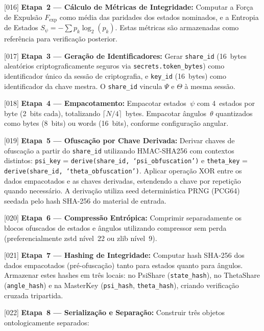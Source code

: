 \documentclass[12pt,a4paper]{article}
\newcommand{\Fexp}{F_{\text{exp}}}
\begin{document}
{[016]} \textbf{Etapa~2 --- Cálculo de Métricas de Integridade:}
Computar a Força de Expulsão $\Fexp$ como média das paridades
dos estados nominados, e a Entropia de Estados
$S_\psi = -\sum p_k \log_2(p_k)$. Estas métricas são
armazenadas como referência para verificação posterior.

{[017]} \textbf{Etapa~3 --- Geração de Identificadores:} Gerar
\texttt{share\_id} (16~bytes aleatórios criptograficamente
seguros via \texttt{secrets.token\_bytes}) como identificador
único da sessão de criptografia, e \texttt{key\_id} (16~bytes)
como identificador da chave mestra. O \texttt{share\_id}
vincula $\Psi$ e $\Theta$ à mesma sessão.

{[018]} \textbf{Etapa~4 --- Empacotamento:} Empacotar
estados~$\psi$ com 4~estados por byte (2~bits cada),
totalizando $\lceil N/4 \rceil$~bytes. Empacotar ângulos~$\theta$
quantizados como bytes (8~bits) ou words (16~bits), conforme
configuração angular.

{[019]} \textbf{Etapa~5 --- Ofuscação por Chave Derivada:}
Derivar chaves de ofuscação a partir do \texttt{share\_id}
utilizando HMAC-SHA256 com contextos distintos:
\texttt{psi\_key} = \texttt{derive(share\_id,
`psi\_obfuscation')} e \texttt{theta\_key} =
\texttt{derive(share\_id, `theta\_obfuscation')}. Aplicar
operação XOR entre os dados empacotados e as chaves derivadas,
estendendo a chave por repetição quando necessário. A derivação
utiliza seed determinística PRNG (PCG64) seedada pelo hash
SHA-256 do material de entrada.

{[020]} \textbf{Etapa~6 --- Compressão Entrópica:} Comprimir
separadamente os blocos ofuscados de estados e ângulos
utilizando compressor sem perda (preferencialmente zstd
nível~22 ou zlib nível~9).

{[021]} \textbf{Etapa~7 --- Hashing de Integridade:} Computar
hash SHA-256 dos dados empacotados (pré-ofuscação) tanto para
estados quanto para ângulos. Armazenar estes hashes em três
locais: no PsiShare (\texttt{state\_hash}), no ThetaShare
(\texttt{angle\_hash}) e na MasterKey (\texttt{psi\_hash},
\texttt{theta\_hash}), criando verificação cruzada tripartida.

{[022]} \textbf{Etapa~8 --- Serialização e Separação:}
Construir três objetos ontologicamente separados:
\end{document}
